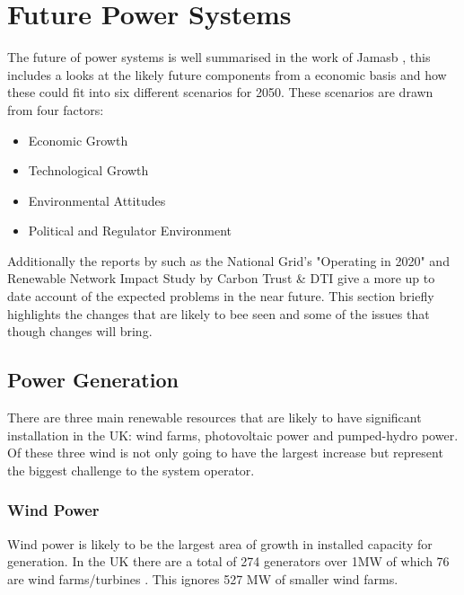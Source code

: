 \documentclass[a4paper,oneside,12pt]{report}
\begin{document}
\chapter{Future Power Systems}

The future of power systems is well summarised in the work of Jamasb \cite{Jamasb2006}, this includes a looks at the likely future components from a economic basis and how these could fit into six different scenarios for 2050. These scenarios are drawn from four factors:

\begin{itemize}
\item Economic Growth
\item Technological Growth
\item Environmental Attitudes
\item Political and Regulator Environment
\end{itemize}

Additionally the reports by such as the National Grid's "Operating in 2020" \cite{Grid2009} and Renewable Network Impact Study by Carbon Trust \& DTI \cite{Trust2005} give a more up to date account of the expected problems in the near future. This section briefly highlights the changes that are likely to bee seen and some of the issues that though changes will bring.

\section{Power Generation}


There are three main renewable resources that are likely to have significant installation in the UK: wind farms, photovoltaic power and pumped-hydro power. Of these three wind is not only going to have the largest increase but represent the biggest challenge to the system operator.

\subsection{Wind Power}

Wind power is likely to be the largest area of growth in installed capacity for generation. In the UK there are a total of 274 generators over 1MW of which 76 are wind farms/turbines \cite{BERR}. This ignores 527 MW of smaller wind farms.
\end{document}
